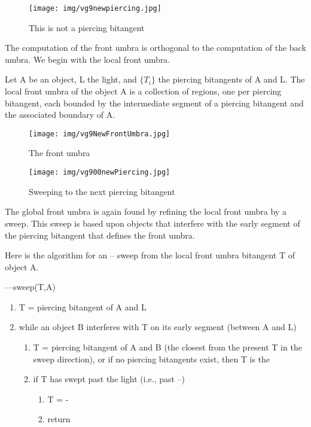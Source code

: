 \documentclass[9pt,twocolumn]{article}
\begin{document}
\begin{figure}
\begin{center}
\texttt{[image: img/vg9newpiercing.jpg]}
\end{center}
\caption{This is not a piercing bitangent}
\end{figure}

The computation of the front umbra is orthogonal to the computation of the
back umbra.
We begin with the local front umbra.

\begin{lemma}
Let A be an object, L the light, and $\{T_i\}$ the piercing bitangents
of A and L.
The local front umbra of the object A is a collection of regions,
one per piercing bitangent,
each bounded by the intermediate segment of a piercing bitangent
and the associated boundary of A.
\end{lemma}

\begin{figure}
\begin{center}
\texttt{[image: img/vg9NewFrontUmbra.jpg]}
\end{center}
\caption{The front umbra}
\end{figure}

\begin{figure}
\begin{center}
\texttt{[image: img/vg900newPiercing.jpg]}
\end{center}
\caption{Sweeping to the next piercing bitangent}
\end{figure}

The global front umbra is again found by refining the local front umbra
by a sweep.
This sweep is based upon objects that interfere with the early segment
of the piercing bitangent that defines the front umbra.

Here is the algorithm for an -- sweep from the local front umbra bitangent T of object A.

\vspace{.2in}

\centerline{---sweep(T,A)}

\begin{enumerate}
\item T = piercing bitangent of A and L
\item while an object B interferes with T on its early segment (between A and L)
\begin{enumerate}
\item T = piercing bitangent of A and B (the closest from the present T 
	in the sweep direction), or if no piercing bitangents exist, then T
	is the 
\item if T has swept past the light (i.e., past --)
\begin{enumerate}
\item  T = -
\item  return
\end{enumerate}
\end{enumerate}
\end{enumerate}
\end{document}

